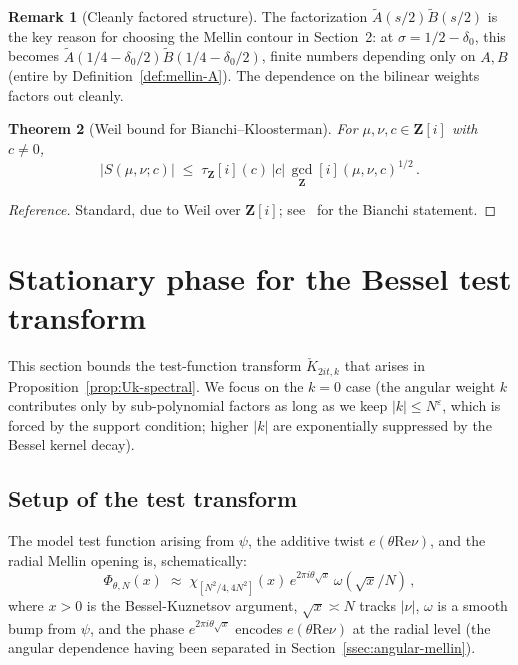 \documentclass[11pt]{article}
\newtheorem{theorem}{Theorem}[section]
\theoremstyle{definition}
\newtheorem{remark}[theorem]{Remark}
\newcommand{\Z}{\mathbf{Z}}
\newcommand{\Zi}{\Z[i]}
\renewcommand{\Re}{\mathrm{Re}}
\begin{document}
\begin{remark}[Cleanly factored structure]\label{rem:factored}
The factorization $\widetilde A(s/2)\widetilde B(s/2)$ is the key reason for choosing the Mellin contour in Section~2: at $\sigma=1/2-\delta_0$, this becomes $\widetilde A(1/4-\delta_0/2)\widetilde B(1/4-\delta_0/2)$, finite numbers depending only on $A,B$ (entire by Definition~\ref{def:mellin-A}). The dependence on the bilinear weights factors out cleanly.
\end{remark}

\begin{theorem}[Weil bound for Bianchi--Kloosterman]\label{thm:weil-bound}
For $\mu,\nu,c\in\Zi$ with $c\ne 0$,
\[
   |S(\mu,\nu;c)|\;\le\;\tau_\Zi(c)\,|c|\,\gcd_\Zi(\mu,\nu,c)^{1/2}\,.
\]
\end{theorem}

\begin{proof}[Reference]
Standard, due to Weil over $\Zi$; see~\cite[\S 4]{LG} for the Bianchi statement.
\end{proof}


\section{Stationary phase for the Bessel test transform}\label{sec:phase}

This section bounds the test-function transform $\check K_{2it,k}$ that arises in Proposition~\ref{prop:Uk-spectral}. We focus on the $k=0$ case (the angular weight $k$ contributes only by sub-polynomial factors as long as we keep $|k|\le N^\varepsilon$, which is forced by the support condition; higher $|k|$ are exponentially suppressed by the Bessel kernel decay).

\subsection{Setup of the test transform}\label{ssec:phase-setup}

The model test function arising from $\psi$, the additive twist $e(\theta\Re\nu)$, and the radial Mellin opening is, schematically:
\begin{equation}\label{eq:Phi-model}
   \Phi_{\theta,N}(x)\;\approx\;\chi_{[N^2/4,4N^2]}(x)\,e^{2\pi i\theta\sqrt x}\,\omega(\sqrt x/N)\,,
\end{equation}
where $x>0$ is the Bessel-Kuznetsov argument, $\sqrt x\asymp N$ tracks $|\nu|$, $\omega$ is a smooth bump from $\psi$, and the phase $e^{2\pi i\theta\sqrt x}$ encodes $e(\theta\Re\nu)$ at the radial level (the angular dependence having been separated in Section~\ref{ssec:angular-mellin}).
\end{document}
